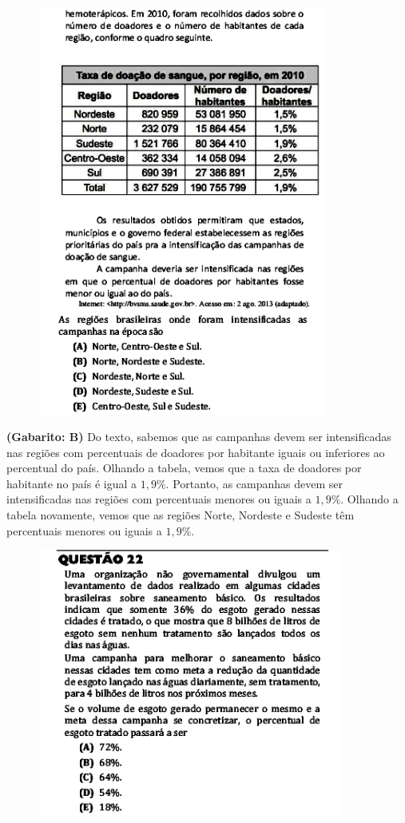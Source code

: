 \documentclass[a4paper]{article}
\begin{document}
\begin{figure}[H]
	\begin{center}
		\includegraphics[width=9.5cm]{L3Q21_2.png}
	\end{center}
\end{figure}
\par\textbf{(Gabarito: B)} Do texto, sabemos que as campanhas devem ser intensificadas nas regiões com percentuais de doadores por habitante iguais ou inferiores ao percentual do país. Olhando a tabela, vemos que a taxa de doadores por habitante no país é igual a $1,9\%$. Portanto, as campanhas devem ser intensificadas nas regiões com percentuais menores ou iguais a $1,9\%$. Olhando a tabela novamente, vemos que as regiões Norte, Nordeste e Sudeste têm percentuais menores ou iguais a $1,9\%$.
\begin{figure}[H]
	\begin{center}
		\includegraphics[width=10cm]{L3Q22.png}
	\end{center}
\end{figure}
\end{document}
